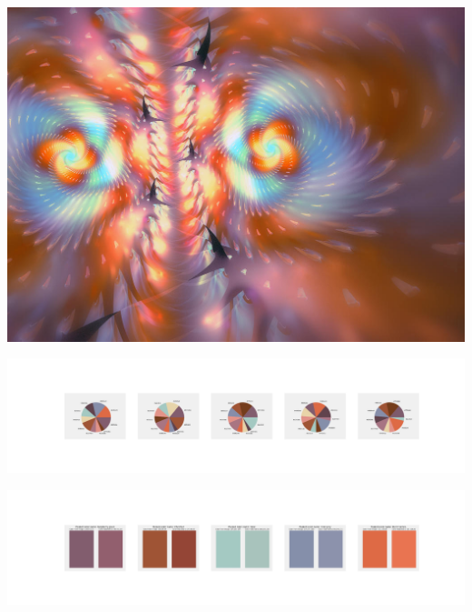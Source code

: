 \documentclass[11pt]{article}
\begin{document}
\begin{landscape}
    \begin{center}
    \includegraphics[width=\textwidth]{./nbimg/file (170).jpg}
    \end{center}

    \begin{center}
    \includegraphics[width=250mm]{./nbimg/pie-79.jpg}
    \end{center}

    \begin{center}
    \includegraphics[width=250mm]{./nbimg/peak-79.jpg}
    \end{center}
    


\end{landscape}
\end{document}
